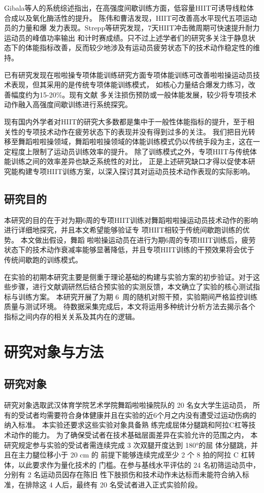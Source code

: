 \documentclass[a4paper,12pt]{article}
\begin{document}
Gibala等人的系统综述指出，在高强度间歇训练方面，低容量HIIT可诱导线粒体合成以及氧化酶活性的提升\cite{gibala2012}。
陈伟和曹洁发现，HIIT可改善高水平现代五项运动员的力量和爆
发力表现\cite{chen2021}。Strepp等研究发现，7天HIIT冲击微周期可快速提升耐力运动员的峰值功率输出
和计时赛成绩\cite{strepp2024}。只不过上述学者们的研究多关注于静息状态下的体能指标改善，反而较少地涉及有运动员疲劳状态下的技术动作稳定性的维持。

已有研究发现在啦啦操专项体能训练研究方面专项体能训练可改善啦啦操运动员技术表现，但其采用的是传统专项体能训练模式，
如核心力量结合爆发力练习，改善幅度约为15-20\%。现有文献
多关注损伤预防或一般体能发展，较少将专项技术动作融入高强度间歇训练进行系统探究。

现有国内外学者对HIIT的研究大多数都是集中于一般性体能指标的提升，至于相关性的专项技术动作在疲劳状态下的表现并没有得到过多的关注。
我们把目光转移至舞蹈啦啦操领域，舞蹈啦啦操领域的体能训练模式仍以传统手段为主，这在一定程度上限制了运动员训练效率的提升。
除了训练模式之外，专项HIIT与传统体能训练之间的效率差异也缺乏系统性的对比，
正是上述研究缺口才得以促使本研究能构建专项HIIT训练方案，以深入探讨其对运动员技术动作表现的实际影响。

\subsection{研究目的}

本研究的目的在于对为期6周的专项HIIT训练对舞蹈啦啦操运动员技术动作的影响进行详细地探究，并且本文希望能够验证专
项HIIT相较于传统间歇跑训练的优势。
本文做出假设，舞蹈
啦啦操运动员在进行为期6周的专项HIIT训练后，疲劳状态下的技术动作衰减率能够显著降低，并且专项HIIT训练的干预效果将会优于传统间歇跑的训练模式。

在实验的初期本研究主要是侧重于理论基础的构建与实验方案的初步验证。对于这些步骤，进行文献调研然后结合预实验的实测反馈，本文确立了实验的核心测试指标与训练方案。
本研究开展了为期 6~周的随机对照干预，实验期间严格监控训练质量与测试环境。
待数据采集完成后，本文将运用多种统计分析方法去揭示各个指标之间内存的相关关系及其内在的逻辑。


\section{研究对象与方法}

\subsection{研究对象}

研究对象选取武汉体育学院艺术学院舞蹈啦啦操院队的 20 名女大学生运动员，
所有的受试者均需要符合身体健康并且在实验的近6个月之内没有遭受过运动伤病的纳入标准。
本实验还要求这些实验对象具备熟
练完成屈体分腿跳和阿拉C杠等技术动作的能力。
为了确保受试者在技术基础层面差异在实验允许的范围之内，
本研究规定参与实验的受试者需连续完成 3 次双腿开度达到 180°的屈
体分腿跳，并且在主力腿位移小于 20 cm 的
前提下能够连续完成至少 2 个 8 拍的阿拉 C 杠转体，以此要求作为量化技术的
门槛。在参与基线水平评估的 24 名初筛运动员中，分别有 2 名运动员因存在陈旧
性下肢损伤和技术动作未达标而未能符合纳入标准，在排除这 4 人后，最终有 20 名受试者进入正式实验阶段。
\end{document}
